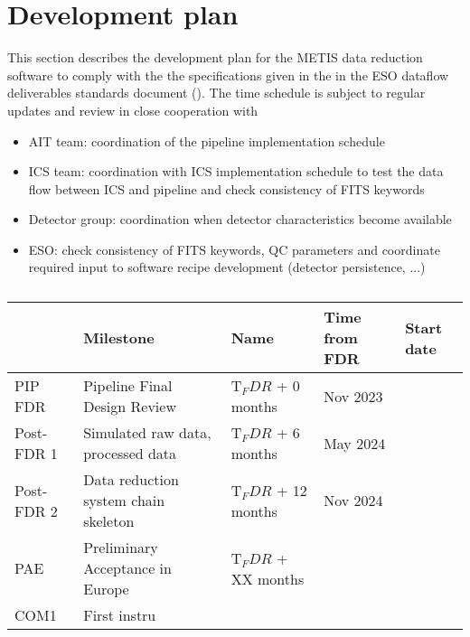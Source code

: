 \clearpage
\section{Development plan}\label{sec:development_plan}

This section describes the development plan for the METIS data reduction software to comply with the the specifications given in the in the ESO dataflow deliverables standards document (\cite{1618}). The time schedule is subject to regular updates and review in close cooperation with

\begin{itemize}
    \item AIT team: coordination of the pipeline implementation schedule
    \item ICS team: coordination with ICS implementation schedule to test the data flow between ICS and pipeline and check consistency of FITS keywords
    \item Detector group: coordination when detector characteristics become available
    \item ESO: check consistency of FITS keywords, QC parameters and coordinate required input to software recipe development (detector persistence, ...)
\end{itemize}

\begin{table}
    \caption[Milestones of the METIS pipeline software development schedule starting at FDR]{}
  \label{tab:calibrations_per_mode}
  \centering\scriptsize
  \begin{tabularx}{\textwidth}{llll}
    \hline
                           & Milestone & Name & Time from FDR & Start date \\
    \hline\hline
    PIP FDR          & Pipeline Final Design Review & T$_FDR$ + 0 months & Nov 2023 \\
    Post-FDR 1       & Simulated raw data, processed data &  T$_FDR$ + 6 months & May 2024 \\
    Post-FDR 2       & Data reduction system chain skeleton &  T$_FDR$ + 12 months & Nov 2024 \\
    PAE              & Preliminary Acceptance in Europe &  T$_FDR$ + XX months &  \\
    COM1             & First instru

    \hline
  \end{tabularx}
\end{table}
